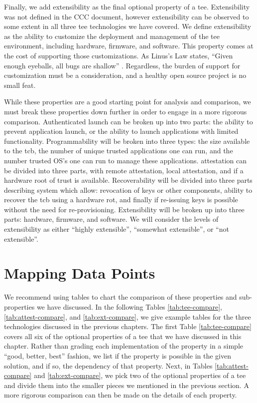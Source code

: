 Finally, we add extensibility as the final optional property of a \gls{tee}. Extensibility was not defined in the CCC document, however extensibility can be observed to some extent in all three \gls{tee} technologies we have covered. We define extensibility as the ability to customize the deployment and management of the \gls{tee} environment, including hardware, firmware, and software. This property comes at the cost of supporting those customizations. As Linus's Law states, ``Given enough eyeballs, all bugs are shallow'' \cite{raymond1999cathedral}. Regardless, the burden of support for customization must be a consideration, and a healthy open source project is no small feat.

While these properties are a good starting point for analysis and comparison, we must break these properties down further in order to engage in a more rigorous comparison. Authenticated launch can be broken up into two parts: the ability to prevent application launch, or the ability to launch applications with limited functionality. Programmability will be broken into three types: the size available to the \gls{tcb}, the number of unique trusted applications one can run, and the number trusted OS's one can run to manage these applications. \Gls{attestation} can be divided into three parts, with remote attestation, local attestation, and if a hardware root of trust is available. Recoverability will be divided into three parts describing system which allow: revocation of keys or other components, ability to recover the \gls{tcb} using a hardware \gls{rot}, and finally if re-issuing keys is possible without the need for re-provisioning. Extensibility will be broken up into three parts: hardware, firmware, and software. We will consider the levels of extensibility as either ``highly extensible'', ``somewhat extensible'', or ``not extensible''.

\section{Mapping Data Points}

We recommend using tables to chart the comparison of these properties and sub-properties we have discussed. In the following Tables \ref{tab:tee-compare}, \ref{tab:attest-compare}, and \ref{tab:ext-compare}, we give example tables for the three technologies discussed in the previous chapters. The first Table \ref{tab:tee-compare} covers all six of the optional properties of a \gls{tee} that we have discussed in this chapter. Rather than grading each implementation of the property in a simple ``good, better, best'' fashion, we list if the property is possible in the given solution, and if so,  the dependency of that property. Next, in Tables \ref{tab:attest-compare} and \ref{tab:ext-compare}, we pick two of the optional properties of a \gls{tee} and divide them into the smaller pieces we mentioned in the previous section. A more rigorous comparison can then be made on the details of each property.

